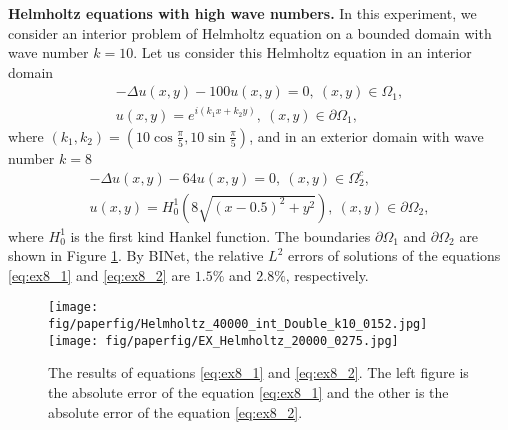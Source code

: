 \documentclass[hyperref]{article}
\numberwithin{equation}{section}
\theoremstyle{nonumberplain}
\begin{document}
	\noindent \textbf{Helmholtz equations with high wave numbers.}
	In this experiment, we consider an interior problem of Helmholtz equation on a bounded domain with wave number $k=10$.
	Let us consider this Helmholtz equation in an interior domain
	\begin{equation}
		\begin{aligned}
			-\Delta u(x,y) - 100u(x,y) = 0,\ (x,y)\in\Omega_1,\\
			u(x,y) = e^{i(k_1x+k_2y)}, \ (x,y)\in\partial\Omega_1,
		\end{aligned}
		\label{eq:ex8_1}
	\end{equation}
	where $(k_1,k_2)=(10\cos\frac{\pi}{5},10\sin\frac{\pi}{5})$,
	and in an exterior domain with wave number $k=8$
	\begin{equation}
		\begin{aligned}
			-\Delta u(x,y) -64u(x,y) = 0,\ (x,y)\in\Omega_2^c,\\
			u(x,y) = H_0^1(8\sqrt{(x-0.5)^2+y^2}), \ (x,y)\in\partial\Omega_2,
		\end{aligned}
		\label{eq:ex8_2}
	\end{equation}
	where $H_0^1$ is the first kind Hankel function. The boundaries $\partial\Omega_1$ and $\partial\Omega_2$ are shown in Figure \ref{fig:app8}. By BINet, the relative $L^2$ errors of solutions of the equations \eqref{eq:ex8_1}
	and \eqref{eq:ex8_2} are $1.5\%$ and $2.8\%$, respectively. 
	\noindent
	\begin{figure}[H]
		\centering
		
		\texttt{[image: fig/paperfig/Helmholtz\_40000\_int\_Double\_k10\_0152.jpg]}
		\centering
		\texttt{[image: fig/paperfig/EX\_Helmholtz\_20000\_0275.jpg]}
		\caption{The results of equations \eqref{eq:ex8_1} and \eqref{eq:ex8_2}. The left figure is the absolute error of the equation \eqref{eq:ex8_1} and the other is the absolute error of the equation \eqref{eq:ex8_2}.}
		\label{fig:app8}
	\end{figure}
	
	
	

	
	
	
	
\end{document}
